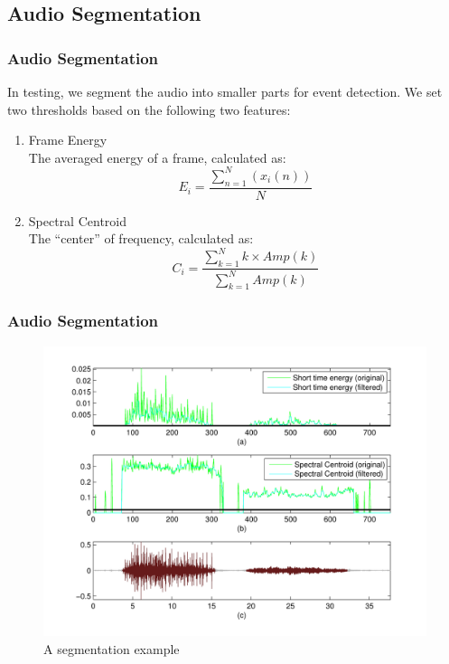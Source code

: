 \documentclass[xcolor=table,slidestop,compress,mathserif]{beamer}
\begin{document}
\subsection{Audio Segmentation}
\begin{frame}
	\frametitle{Audio Segmentation}	
	In testing, we segment the audio into smaller parts for event detection. 
	We set two thresholds based on the following two features: 
	\begin{enumerate}
		\item{Frame Energy} \\ 
		The averaged energy of a frame, calculated as: 
		\begin{equation}
		E_i = \frac{\sum\limits_{n=1}^N(x_i(n))}{N}
		\end{equation}
		\item{Spectral Centroid} \\ 
		The ``center'' of frequency, calculated as: 
		\begin{equation}
		C_i = \frac{\sum\limits_{k=1}^Nk\times Amp(k)}{\sum\limits_{k=1}^NAmp(k)}
		\end{equation}
	\end{enumerate}
\end{frame}
\begin{frame}
	\frametitle{Audio Segmentation}
	
	\begin{figure}[htb]
	\centering
	\includegraphics[scale=0.5]{figure/segment.pdf}
	\caption{A segmentation example}
	\label{fig:segment}
	\end{figure}
\end{frame}
\end{document}
